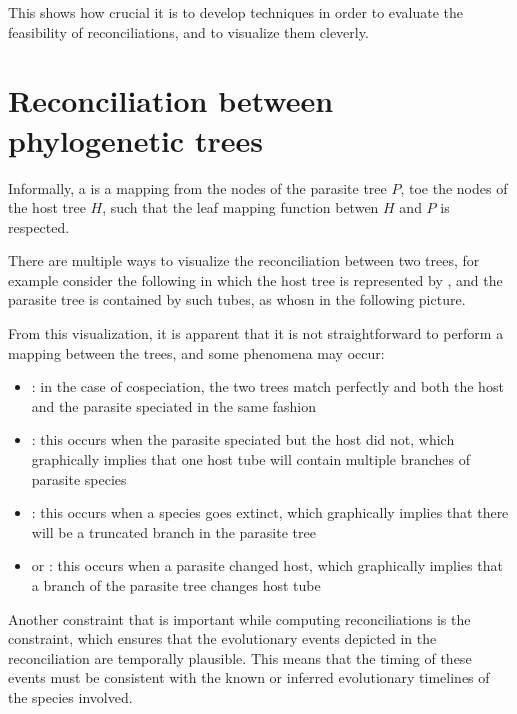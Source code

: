 \documentclass[a4paper, 12pt]{report}
\begin{document}
    This shows how crucial it is to develop techniques in order to evaluate the feasibility of reconciliations, and to visualize them cleverly.

    \section{Reconciliation between phylogenetic trees}

    Informally, a  is a mapping from the nodes of the parasite tree $P$, toe the nodes of the host tree $H$, such that the leaf mapping function betwen $H$ and $P$ is respected.


    There are multiple ways to visualize the reconciliation between two trees, for example consider the following in which the host tree is represented by , and the parasite tree is contained by such tubes, as whosn in the following picture.


    From this visualization, it is apparent that it is not straightforward to perform a mapping between the trees, and some phenomena may occur:

    \begin{itemize}
        \item {}: in the case of cospeciation, the two trees match perfectly and both the host and the parasite speciated in the same fashion
        \item {}: this occurs when the parasite speciated but the host did not, which graphically implies that one host tube will contain multiple branches of parasite species
        \item {}: this occurs when a species goes extinct, which graphically implies that there will be a truncated branch in the parasite tree
        \item {} or : this occurs when a parasite changed host, which graphically implies that a branch of the parasite tree changes host tube
    \end{itemize}

    Another constraint that is important while computing reconciliations is the  constraint, which ensures that the evolutionary events depicted in the reconciliation are temporally plausible. This means that the timing of these events must be consistent with the known or inferred evolutionary timelines of the species involved.
\end{document}
